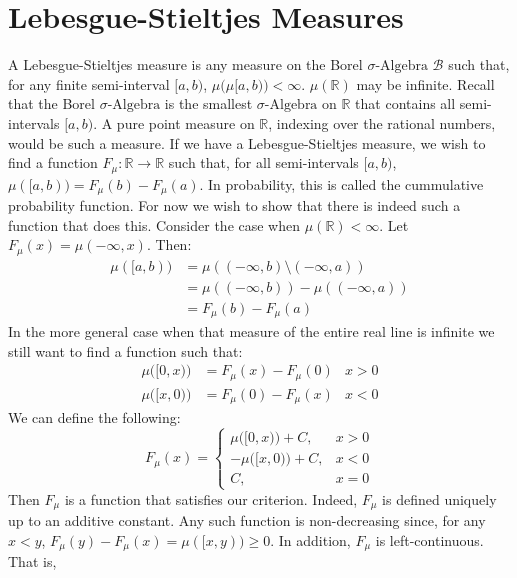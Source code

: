 \section{Lebesgue-Stieltjes Measures}
    A Lebesgue-Stieltjes measure is any measure on the
    Borel $\sigma\text{-Algebra}$ $\mathcal{B}$ such that,
    for any finite semi-interval $[a,b)$,
    $\mu\big(\mu[a,b)\big)<\infty$. $\mu(\mathbb{R})$ may
    be infinite. Recall that the Borel $\sigma\text{-Algebra}$
    is the smallest $\sigma\text{-Algebra}$ on $\mathbb{R}$
    that contains all semi-intervals $[a,b)$. A pure point
    measure on $\mathbb{R}$, indexing over the rational
    numbers, would be such a measure. If we have a
    Lebesgue-Stieltjes measure, we wish to find a function
    $F_{\mu}:\mathbb{R}\rightarrow\mathbb{R}$ such that, for
    all semi-intervals $[a,b)$,
    $\mu([a,b))=F_{\mu}(b)-F_{\mu}(a)$. In probability, this
    is called the cummulative probability function. For now
    we wish to show that there is indeed such a function that
    does this. Consider the case when $\mu(\mathbb{R})<\infty$.
    Let $F_{\mu}(x)=\mu(-\infty,x)$. Then:
    \begin{align}
        \mu([a,b))
        &=\mu((-\infty,b)\setminus(-\infty,a))\\
        &=\mu((-\infty,b))-\mu((-\infty,a))\\
        &=F_{\mu}(b)-F_{\mu}(a)
    \end{align}
    In the more general case when that measure of the entire
    real line is infinite we still want to find a function
    such that:
    \begin{align}
        \mu\big([0,x)\big)&=F_{\mu}(x)-F_{\mu}(0)&x>0\\
        \mu\big([x,0)\big)&=F_{\mu}(0)-F_{\mu}(x)&x<0
    \end{align}
    We can define the following:
    \begin{equation}
        F_{\mu}(x)=
        \begin{cases}
            \mu\big([0,x)\big)+C,&x>0\\
            -\mu\big([x,0)\big)+C,&x<0\\
            C,&x=0
        \end{cases}
    \end{equation}
    Then $F_{\mu}$ is a function that satisfies our criterion.
    Indeed, $F_{\mu}$ is defined uniquely up to an additive
    constant. Any such function is non-decreasing since, for
    any $x<y$, $F_{\mu}(y)-F_{\mu}(x)=\mu([x,y))\geq{0}$.
    In addition, $F_{\mu}$ is left-continuous. That is,
